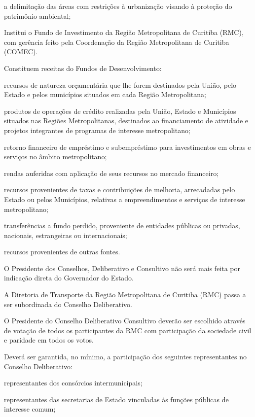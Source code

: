 \documentclass[capitulo]{br-lex-2017}
\begin{document}
		\inciso a delimitação das áreas com restrições à urbanização visando à proteção do patrimônio ambiental;
		
		\artigo Institui o Fundo de Investimento da Região Metropolitana de Curitiba (RMC), com gerência feito pela Coordenação da Região Metropolitana de Curitiba (COMEC).

\artigo Constituem receitas do Fundos de Desenvolvimento:

	\inciso recursos de natureza orçamentária que lhe forem destinados pela União, pelo Estado e pelos municípios situados em cada Região Metropolitana;
	
	\inciso produtos de operações de crédito realizadas pela União, Estado e Municípios situados nas Regiões Metropolitanas, destinados ao financiamento de atividade e projetos integrantes de programas de interesse metropolitano;
	
	\inciso retorno financeiro de empréstimo e subempréstimo para investimentos em obras e serviços no âmbito metropolitano;
	
	\inciso rendas auferidas com aplicação de seus recursos no mercado financeiro;
	
	\inciso recursos provenientes de taxas e contribuições de melhoria, arrecadadas pelo Estado ou pelos Municípios, relativas a empreendimentos e serviços de interesse metropolitano;
	
	\inciso transferências a fundo perdido, proveniente de entidades públicas ou privadas, nacionais, estrangeiras ou internacionais;
	
	\inciso recursos provenientes de outras fontes.

\artigo O Presidente dos Conselhos, Deliberativo e Consultivo não será mais feita por indicação direta do Governador do Estado.

\artigo A Diretoria de Transporte da Região Metropolitana de Curitiba (RMC) passa a ser subordinada do Conselho Deliberativo.

\artigo O Presidente do Conselho Deliberativo Consultivo deverão ser escolhido através de votação de todos os participantes da RMC com participação da sociedade civil e paridade em todos os votos.

\artigo Deverá ser garantida, no mínimo, a participação dos seguintes representantes no Conselho Deliberativo:

	\inciso representantes dos consórcios intermunicipais;
	
	\inciso representantes das secretarias de Estado vinculadas às funções públicas de interesse comum;
	
\end{document}
